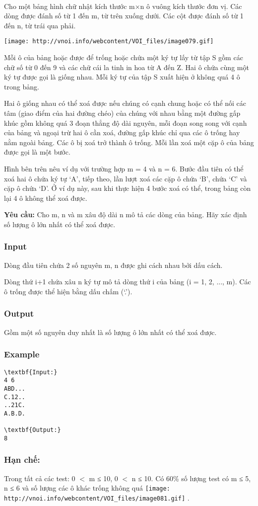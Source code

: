 

 

Cho một bảng hình chữ nhật kích thước m×n ô vuông kích thước đơn vị. Các dòng được đánh số từ 1 đến m, từ trên xuống dưới. Các cột được đánh số từ 1 đến n, từ trái qua phải.


\texttt{[image: http://vnoi.info/webcontent/VOI\_files/image079.gif]}

Mỗi ô của bảng hoặc được để trống hoặc chứa một ký tự lấy từ tập S gồm các chữ số từ 0 đến 9 và các chữ cái la tinh in hoa từ A đến Z. Hai ô chứa cùng một ký tự được gọi là giống nhau. Mỗi ký tự của tập S xuất hiện ở không quá 4 ô trong bảng.

Hai ô giống nhau có thể xoá được nếu chúng có cạnh chung hoặc có thể nối các tâm (giao điểm của hai đường chéo) của chúng với nhau bằng một đường gấp khúc gồm không quá 3 đoạn thẳng độ dài nguyên, mỗi đoạn song song với cạnh của bảng và ngoại trừ hai ô cần xoá, đường gấp khúc chỉ qua các ô trống hay nằm ngoài bảng. Các ô bị xoá trở thành ô trống. Mỗi lần xoá một cặp ô của bảng được gọi là một bước.

Hình bên trên nêu ví dụ với trường hợp m = 4 và n = 6. Bước đầu tiên có thể xoá hai ô chứa ký tự ‘A’, tiếp theo, lần lượt xoá các cặp ô chứa ‘B’, chứa ‘C’ và cặp ô chứa ‘D’. Ở ví dụ này, sau khi thực hiện 4 bước xoá có thể, trong bảng còn lại 4 ô không thể xoá được.

\textbf{Yêu cầu: } Cho m, n và m xâu độ dài n mô tả các dòng của bảng. Hãy xác định số lượng ô lớn nhất có thể xoá được.

\subsubsection{Input}

Dòng đầu tiên chứa 2 số nguyên m, n được ghi cách nhau bởi dấu cách.

Dòng thứ i+1 chứa xâu n ký tự mô tả dòng thứ i của bảng (i = 1, 2, ..., m). Các ô trống được thể hiện bằng dấu chấm (‘.’).

\subsubsection{Output}

Gồm một số nguyên duy nhất là số lượng ô lớn nhất có thể xoá được.

\subsubsection{Example}
\begin{verbatim}
\textbf{Input:}
4 6
ABD...
C.12..
..21C.
A.B.D.

\textbf{Output:}
8
\end{verbatim}

\subsubsection{Hạn chế:}

Trong tất cả các test: 0 $<$ m ≤ 10, 0 $<$ n ≤ 10. Có 60\% số lượng test có m ≤ 5, n ≤ 6 và số lượng các ô khác trống không quá 
\texttt{[image: http://vnoi.info/webcontent/VOI\_files/image081.gif]} .